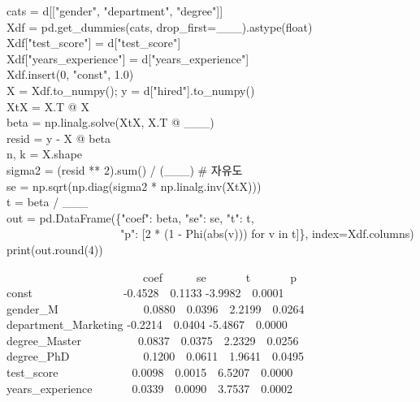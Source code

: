 \documentclass[11pt,a4paper]{article}
\begin{document}
\begin{codebox}
cats = d[["gender", "department", "degree"]]\\
Xdf = pd.get\_dummies(cats, drop\_first=\_\_\_).astype(float)\\
Xdf["test\_score"] = d["test\_score"]\\
Xdf["years\_experience"] = d["years\_experience"]\\
Xdf.insert(0, "const", 1.0)\\
X = Xdf.to\_numpy(); y = d["hired"].to\_numpy()\\[3pt]
XtX = X.T @ X\\
beta = np.linalg.solve(XtX, X.T @ \_\_\_)\\
resid = y - X @ beta\\
n, k = X.shape\\
sigma2 = (resid ** 2).sum() / (\_\_\_) \hfill \# 자유도\\
se = np.sqrt(np.diag(sigma2 * np.linalg.inv(XtX)))\\
t = beta / \_\_\_\\
out = pd.DataFrame(\{"coef": beta, "se": se, "t": t,\\
\ \ \ \ \ \ \ \ \ \ \ \ \ \ \ \ \ \ \ \ "p": [2 * (1 - Phi(abs(v))) for v in t]\}, index=Xdf.columns)\\
print(out.round(4))
\end{codebox}
\begin{outbox}
\ \ \ \ \ \ \ \ \ \ \ \ \ \ \ \ \ \ \ \ \ \ \ \ coef\ \ \ \ \ \ se\ \ \ \ \ \ \ t\ \ \ \ \ \ \ p\\
const\ \ \ \ \ \ \ \ \ \ \ \ \ \ \ \ -0.4528\ \ 0.1133 -3.9982\ \ 0.0001\\
gender\_M\ \ \ \ \ \ \ \ \ \ \ \ \ \ \ 0.0880\ \ 0.0396\ \ 2.2199\ \ 0.0264\\
department\_Marketing -0.2214\ \ 0.0404 -5.4867\ \ 0.0000\\
degree\_Master\ \ \ \ \ \ \ \ \ \ 0.0837\ \ 0.0375\ \ 2.2329\ \ 0.0256\\
degree\_PhD\ \ \ \ \ \ \ \ \ \ \ \ \ 0.1200\ \ 0.0611\ \ 1.9641\ \ 0.0495\\
test\_score\ \ \ \ \ \ \ \ \ \ \ \ \ 0.0098\ \ 0.0015\ \ 6.5207\ \ 0.0000\\
years\_experience\ \ \ \ \ \ \ 0.0339\ \ 0.0090\ \ 3.7537\ \ 0.0002
\end{outbox}
\end{document}
